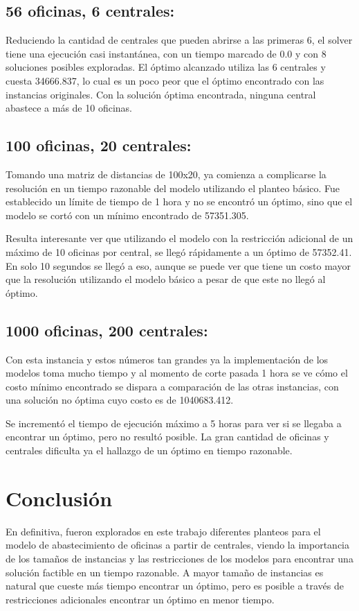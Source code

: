 \documentclass{article}
\begin{document}
\subsection*{56 oficinas, 6 centrales:}
Reduciendo la cantidad de centrales que pueden abrirse a las primeras 6, el solver tiene una ejecución casi instantánea, con un tiempo marcado de 0.0 y con 8 soluciones posibles exploradas. El óptimo alcanzado utiliza las 6 centrales y cuesta 34666.837, lo cual es un poco peor que el óptimo encontrado con las instancias originales. Con la solución óptima encontrada, ninguna central abastece a más de 10 oficinas.

\subsection*{100 oficinas, 20 centrales:}
Tomando una matriz de distancias de 100x20, ya comienza a complicarse la resolución en un tiempo razonable del modelo utilizando el planteo básico. Fue establecido un límite de tiempo de 1 hora y no se encontró un óptimo, sino que el modelo se cortó con un mínimo encontrado de 57351.305.

Resulta interesante ver que utilizando el modelo con la restricción adicional de un máximo de 10 oficinas por central, se llegó rápidamente a un óptimo de 57352.41. En solo 10 segundos se llegó a eso, aunque se puede ver que tiene un costo mayor que la resolución utilizando el modelo básico a pesar de que este no llegó al óptimo.

\subsection*{1000 oficinas, 200 centrales:}
Con esta instancia y estos números tan grandes ya la implementación de los modelos toma mucho tiempo y al momento de corte pasada 1 hora se ve cómo el costo mínimo encontrado se dispara a comparación de las otras instancias, con una solución no óptima cuyo costo es de 1040683.412.

Se incrementó el tiempo de ejecución máximo a 5 horas para ver si se llegaba a encontrar un óptimo, pero no resultó posible. La gran cantidad de oficinas y centrales dificulta ya el hallazgo de un óptimo en tiempo razonable.

\section*{Conclusión}
En definitiva, fueron explorados en este trabajo diferentes planteos para el modelo de abastecimiento de oficinas a partir de centrales, viendo la importancia de los tamaños de instancias y las restricciones de los modelos para encontrar una solución factible en un tiempo razonable. A mayor tamaño de instancias es natural que cueste más tiempo encontrar un óptimo, pero es posible a través de restricciones adicionales encontrar un óptimo en menor tiempo.
\end{document}
